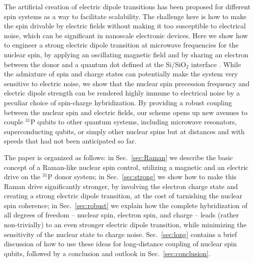 \documentclass[
 aps,prb,twocolumn,
 amsmath,amssymb,superscriptaddress,
] {revtex4-1}
\begin{document}
The artificial creation of electric dipole transitions has been proposed for different spin systems \cite{Pioro-Ladriere2008,Shi2012,Russ2016,Salfi2016,Tosi2017} as a way to facilitate scalability. The challenge here is how to make the spin drivable by electric fields without making it too susceptible to electrical noise, which can be significant in nanoscale electronic devices. Here we show how to engineer a strong electric dipole transition at microwave frequencies for the nuclear spin, by applying an oscillating magnetic field and by sharing an electron between the donor and a quantum dot defined at the Si/SiO$_2$ interface \cite{Calderon2006,Veldhorst2014, Tosi2017,Harvey-Collard2017}. While the admixture of spin and charge states can potentially make the system very sensitive to electric noise, we show that the nuclear spin precession frequency and electric dipole strength can be rendered highly immune to electrical noise by a peculiar choice of spin-charge hybridization. By providing a robust coupling between the nuclear spin and electric fields, our scheme opens up new avenues to couple $^{31}$P qubits to other quantum systems, including microwave resonators, superconducting qubits, or simply other nuclear spins but at distances and with speeds that had not been anticipated so far.

The paper is organized as follows: in Sec.~\ref{sec:Raman} we describe the basic concept of a Raman-like nuclear spin control, utilizing a magnetic and an electric drive on the $^{31}$P donor system; in Sec.~\ref{sec:strong} we show how to make this Raman drive significantly stronger, by involving the electron charge state and creating a strong electric dipole transition, at the cost of tarnishing the nuclear spin coherence; in Sec.~\ref{sec:robust} we explain how the complete hybridization of all degrees of freedom -- nuclear spin, electron spin, and charge -- leads (rather non-trivially) to an even stronger electric dipole transition, while minimizing the sensitivity of the nuclear state to charge noise. Sec.~\ref{sec:long} contains a brief discussion of how to use these ideas for long-distance coupling of nuclear spin qubits, followed by a conclusion and outlook in Sec.~\ref{sec:conclusion}.
\end{document}
